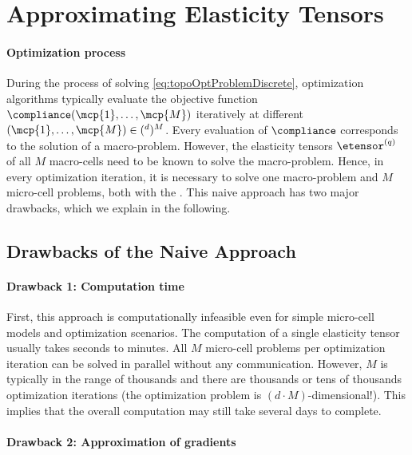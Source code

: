 \section{Approximating Elasticity Tensors}
\label{sec:62tensors}

\paragraph{Optimization process}


During the process of solving \eqref{eq:topoOptProblemDiscrete},
optimization algorithms typically
evaluate the objective function $\compliance(\mcp{1}, \dotsc, \mcp{M})$
iteratively at different 
$(\mcp{1}, \dotsc, \mcp{M}) \in (\real^d)^M$.
Every evaluation of $\compliance$ corresponds to the solution of a
macro-problem.
However, the elasticity tensors $\etensor^{(q)}$ of all $M$ macro-cells
need to be known to solve the macro-problem.
Hence, in every optimization iteration, it is necessary to solve
one macro-problem and $M$ micro-cell problems,
both with the \fem.
This naive approach has two major drawbacks, which we explain in
the following.



\subsection{Drawbacks of the Naive Approach}
\label{sec:621drawbacks}

\paragraph{Drawback 1: Computation time}

First, this approach is computationally infeasible
even for simple micro-cell models and optimization scenarios.
The computation of a single elasticity tensor usually takes seconds to
minutes.
All $M$ micro-cell problems per optimization iteration
can be solved in parallel without any communication.
However, $M$ is typically in the range of thousands and
there are thousands or tens of thousands optimization iterations
(the optimization problem is $(d \cdot M)$-dimensional!).
This implies that the overall computation may still take
several days to complete.

\paragraph{Drawback 2: Approximation of gradients}

